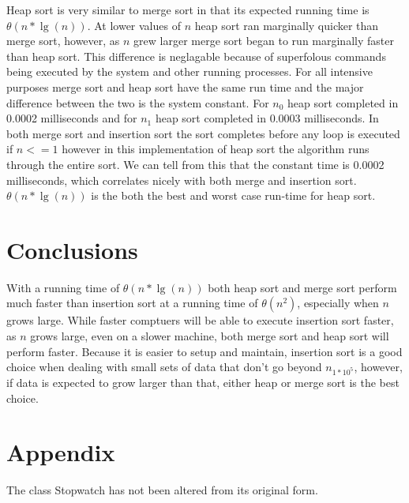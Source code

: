 \documentclass[onecolumn, 12pt, article]{IEEEtran}
\numberwithin{case}{problem}
\numberwithin{condition}{problem}
\numberwithin{condition}{subsection}
\numberwithin{definition}{section}
\theoremstyle{remark}
\numberwithin{question}{problem}
\theoremstyle{plain}
\numberwithin{answer}{problem}
\numberwithin{solution}{section}
\numberwithin{equation}{section}%
\begin{document}
Heap sort is very similar to merge sort in that its expected running time is $ \theta(n*\lg(n)) $. At lower values of $n$ heap sort ran marginally quicker than merge sort, however, as $n$ grew larger merge sort began to run marginally faster than heap sort. This difference is neglagable because of superfolous commands being executed by the system and other running processes. For all intensive purposes merge sort and heap sort have the same run time and the major difference between the two is the system constant. For $n_0$ heap sort completed in 0.0002 milliseconds and for $n_1$ heap sort completed in 0.0003 milliseconds. In both merge sort and insertion sort the sort completes before any loop is executed if $n <= 1$ however in this implementation of heap sort the algorithm runs through the entire sort. We can tell from this that the constant time is 0.0002 milliseconds, which correlates nicely with both merge and insertion sort. $ \theta(n*\lg(n)) $ is the both the best and worst case run-time for heap sort.

\section{Conclusions}
With a running time of $ \theta(n*\lg(n)) $ both heap sort and merge sort perform much faster than insertion sort at a running time of $ \theta(n^2) $, especially when $n$ grows large. While faster comptuers will be able to execute insertion sort faster, as $n$ grows large, even on a slower machine, both merge sort and heap sort will perform faster. Because it is easier to setup and maintain, insertion sort is a good choice when dealing with small sets of data that don't go beyond $n_{1*10^5}$, however, if data is expected to grow larger than that, either heap or merge sort is the best choice.

\newpage


\nocite{*}




\newpage

\section*{Appendix}




The class Stopwatch has not been altered from its original form.
\newline



\end{document}
